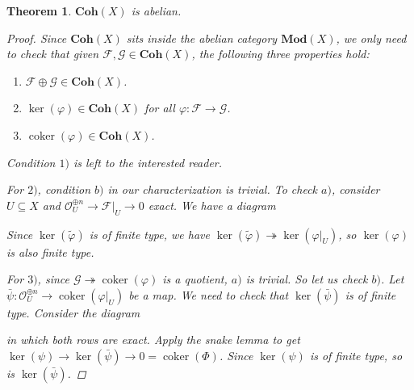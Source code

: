 \documentclass[12pt]{article}
\theoremstyle{darkgreentheorem}
\newtheorem{thm}{Theorem}[section]
\theoremstyle{darkbluedefinition}
\theoremstyle{darkredexample}
\theoremstyle{remark}
\newcommand{\1}{\mathbbm{1}}
\newcommand{\Coh}{\mathbf{Coh}}
\newcommand{\Mod}{\mathbf{Mod}}
\newcommand{\F}{\mathcal{F}}
\newcommand{\G}{\mathcal{G}}
\renewcommand{\O}{\mathcal{O}}
\DeclareMathOperator{\im}{im}
\DeclareMathOperator{\coker}{coker}
\newcommand{\op}{\oplus}
\newcommand{\sub}{\subseteq}
\newcommand{\epi}{\twoheadrightarrow}
\begin{document}
\begin{thm}
    $\Coh(X)$ is abelian.
    \begin{proof}
	Since $\Coh(X)$ sits inside the abelian category $\Mod(X)$, we only need to check that given $\F,\G\in \Coh(X)$, the following three properties hold:
	\begin{enumerate}
	    \item $\F\op \G\in \Coh(X)$.
	    \item $\ker(\varphi)\in \Coh(X)$ for all $\varphi\colon \F\to \G$.
	    \item $\coker(\varphi)\in \Coh(X)$.
	\end{enumerate}
	Condition $1)$ is left to the interested reader.

	For $2)$, condition $b)$ in our characterization is trivial.
	To check $a)$, consider $U\sub X$ and $\O_{U}^{\op n}\to \F|_{U}\to 0$ exact.
	We have a diagram
	\begin{center}
	\end{center}
	Since $\ker(\tilde{\varphi})$ is of finite type, we have $\ker(\tilde{\varphi})\epi \ker(\varphi|_{U})$, so $\ker(\varphi)$ is also finite type.
	
	For $3)$, since $\G\epi \coker(\varphi)$ is a quotient, $a)$ is trivial.
	So let us check $b)$.
	Let $\bar{\psi}\colon \O_{U}^{\op n}\to \coker(\varphi|_{U})$ be a map.
	We need to check that $\ker(\bar{\psi})$ is of finite type.
	Consider the diagram
	\begin{center}
	\end{center}
	in which both rows are exact.
	Apply the snake lemma to get $\ker(\psi)\to \ker(\bar{\psi})\to 0=\coker(\Phi)$.
	Since $\ker(\psi)$ is of finite type, so is $\ker(\bar{\psi})$.
    \end{proof}
\end{thm}



\end{document}
